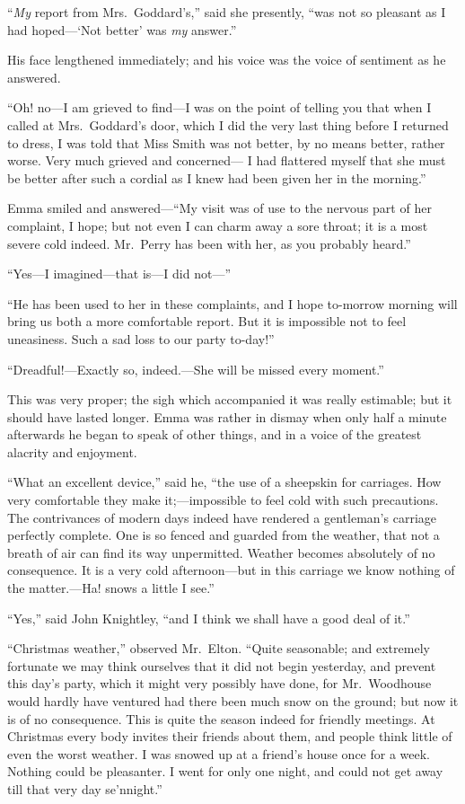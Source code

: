 ``\emph{My} report from Mrs.\ Goddard's,'' said she presently, ``was not
so pleasant as I had hoped---`Not better' was \emph{my} answer.''

His face lengthened immediately; and his voice was the voice
of sentiment as he answered.

``Oh! no---I am grieved to find---I was on the point of telling you that
when I called at Mrs.\ Goddard's door, which I did the very last thing
before I returned to dress, I was told that Miss Smith was not better,
by no means better, rather worse.  Very much grieved and concerned---%
I had flattered myself that she must be better after such a cordial
as I knew had been given her in the morning.''

Emma smiled and answered---``My visit was of use to the nervous part
of her complaint, I hope; but not even I can charm away a sore throat;
it is a most severe cold indeed.  Mr.\ Perry has been with her,
as you probably heard.''

``Yes---I imagined---that is---I did not---''

``He has been used to her in these complaints, and I hope to-morrow
morning will bring us both a more comfortable report.  But it is
impossible not to feel uneasiness.  Such a sad loss to our party to-day!''

``Dreadful!---Exactly so, indeed.---She will be missed every moment.''

This was very proper; the sigh which accompanied it was really estimable;
but it should have lasted longer.  Emma was rather in dismay when
only half a minute afterwards he began to speak of other things,
and in a voice of the greatest alacrity and enjoyment.

``What an excellent device,'' said he, ``the use of a sheepskin
for carriages.  How very comfortable they make it;---impossible to
feel cold with such precautions.  The contrivances of modern days
indeed have rendered a gentleman's carriage perfectly complete.
One is so fenced and guarded from the weather, that not a breath
of air can find its way unpermitted.  Weather becomes absolutely
of no consequence.  It is a very cold afternoon---but in this carriage
we know nothing of the matter.---Ha! snows a little I see.''

``Yes,'' said John Knightley, ``and I think we shall have a good deal
of it.''

``Christmas weather,'' observed Mr.\ Elton.  ``Quite seasonable;
and extremely fortunate we may think ourselves that it did not
begin yesterday, and prevent this day's party, which it might very
possibly have done, for Mr.\ Woodhouse would hardly have ventured had
there been much snow on the ground; but now it is of no consequence.
This is quite the season indeed for friendly meetings.  At Christmas
every body invites their friends about them, and people think little
of even the worst weather.  I was snowed up at a friend's house once
for a week.  Nothing could be pleasanter.  I went for only one night,
and could not get away till that very day se'nnight.''


